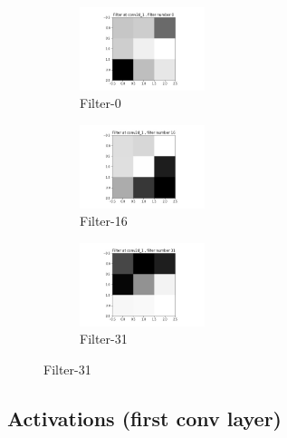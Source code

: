 \begin{figure}[!htbp]
\begin{subfigure}
\centering
\includegraphics[angle=0,width=0.4\textwidth]{assign-2/logs/vis/filter-conv2d_1-0.jpg}
\caption{Filter-0}
\end{subfigure}
\begin{subfigure}
\centering
\includegraphics[angle=0,width=0.4\textwidth]{assign-2/logs/vis/filter-conv2d_1-16.jpg}
\caption{Filter-16}
\end{subfigure}
\begin{subfigure}
\centering
\includegraphics[angle=0,width=0.4\textwidth]{assign-2/logs/vis/filter-conv2d_1-31.jpg}
\caption{Filter-31}
\end{subfigure}
\end{figure}

\subsection{Activations (first conv layer)}

